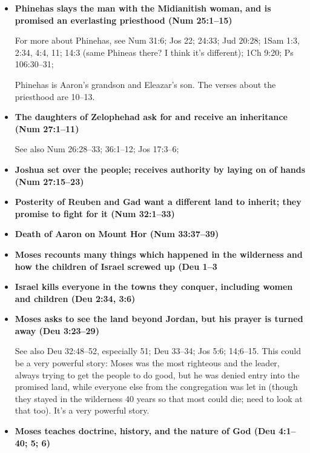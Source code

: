 \begin{itemize}
	Note verses 24:2--4 and 24:15--16, where it describes the process of receiving the vision; very familiar language in those verses.

\item \textbf{Phinehas slays the man with the Midianitish woman, and is promised an everlasting priesthood (Num 25:1--15)} %

	For more about Phinehas, see Num 31:6; Jos 22; 24:33; Jud 20:28; 1Sam 1:3, 2:34, 4:4, 11; 14:3 (same Phineas there? I think it's different); 1Ch 9:20; Ps 106:30--31;

	Phinehas is Aaron's grandson and Eleazar's son. The verses about the priesthood are 10--13.

\item \textbf{The daughters of Zelophehad ask for and receive an inheritance (Num 27:1--11)}

	See also Num 26:28--33; 36:1--12; Jos 17:3--6;

\item \textbf{Joshua set over the people; receives authority by laying on of hands (Num 27:15--23)}

\item \textbf{Posterity of Reuben and Gad want a different land to inherit; they promise to fight for it (Num 32:1--33)}

\item \textbf{Death of Aaron on Mount Hor (Num 33:37--39)}

\item \textbf{Moses recounts many things which happened in the wilderness and how the children of Israel screwed up (Deu 1--3}

\item \textbf{Israel kills everyone in the towns they conquer, including women and children (Deu 2:34, 3:6)}

\item \textbf{Moses asks to see the land beyond Jordan, but his prayer is turned away (Deu 3:23--29)}

	See also Deu 32:48--52, especially 51; Deu 33--34; Jos 5:6; 14;6--15. This could be a very powerful story: Moses was the most righteous and the leader, always trying to get the people to do good, but he was denied entry into the promised land, while everyone else from the congregation was let in (though they stayed in the wilderness 40 years so that most could die; need to look at that too). It's a very powerful story.

\item \textbf{Moses teaches doctrine, history, and the nature of God (Deu 4:1--40; 5; 6)}


\end{itemize}
